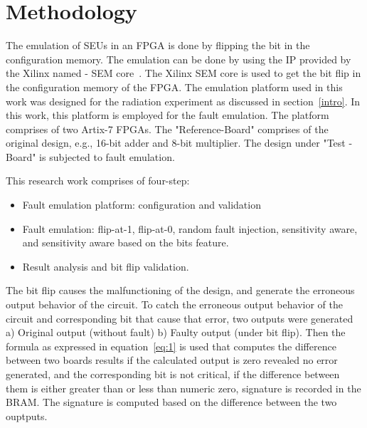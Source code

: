 \section{Methodology}
\label{Methodology}



The emulation of SEUs in an FPGA is done by flipping the bit in the configuration memory. The emulation can be done by using the IP provided by the Xilinx named - SEM core~\cite{xilinx}. The Xilinx SEM core is used to get the bit flip in the configuration memory of the FPGA. The emulation platform used in this work was designed for the radiation experiment as discussed in section~\ref{intro}. In this work, this platform is employed for the fault emulation. The platform comprises of two Artix-7 FPGAs. The "Reference-Board" comprises of the original design, e.g., 16-bit adder and 8-bit multiplier. The design under "Test -Board" is subjected to fault emulation.  




This research work comprises of four-step:
\begin{itemize}
\item{Fault emulation platform: configuration and validation}
\item{Fault emulation: flip-at-1, flip-at-0, random fault injection, sensitivity aware, and sensitivity aware based on the bits feature}.
\item{Result analysis and bit flip validation}.
\end{itemize}


The bit flip causes the malfunctioning of the design, and generate the erroneous output behavior of the circuit. To catch the erroneous output behavior of the circuit and corresponding bit that cause that error, two outputs were generated a) Original output (without fault) b) Faulty output (under bit flip). Then the formula as expressed in equation~\ref{eq:1} is used that computes the difference between two boards results if the calculated output is zero revealed no error generated, and the corresponding bit is not critical, if the difference between them is either greater than or less than numeric zero, signature is recorded in the BRAM. The signature is computed based on the difference between the two ouptputs.

